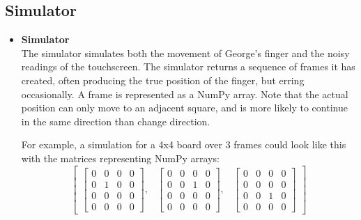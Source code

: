 \documentclass{article}
\begin{document}
\subsection{Simulator}
\begin{itemize}
    \item \textbf{Simulator} \\
    The simulator simulates both the movement of George’s finger and the noisy readings of the touchscreen. The simulator returns a sequence of frames it has created, often producing the true position of the finger, but erring occasionally. A frame is represented as a NumPy array. Note that the actual position can only move to an adjacent square, and is more likely to continue in the same direction than change direction.

    For example, a simulation for a 4x4 board over 3 frames could look like this with the matrices representing NumPy arrays:
    \[
        \begin{bmatrix}
            \begin{bmatrix}
                0 & 0 & 0 & 0 \\
                0 & 1 & 0 & 0 \\
                0 & 0 & 0 & 0 \\
                0 & 0 & 0 & 0
            \end{bmatrix}, &
            \begin{bmatrix}
                0 & 0 & 0 & 0 \\
                0 & 0 & 1 & 0 \\
                0 & 0 & 0 & 0 \\
                0 & 0 & 0 & 0
            \end{bmatrix}, &
            \begin{bmatrix}
                0 & 0 & 0 & 0 \\
                0 & 0 & 0 & 0 \\
                0 & 0 & 1 & 0 \\
                0 & 0 & 0 & 0
            \end{bmatrix}
        \end{bmatrix}
    \]


\end{itemize}
\end{document}
